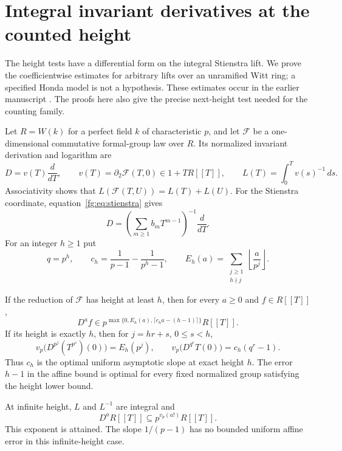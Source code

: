 \section{Integral invariant derivatives at the counted height}\label{fg:sec:derivatives}
The height tests have a differential form on the integral Stienstra
lift. We prove the coefficientwise estimates for arbitrary lifts over
an unramified Witt ring; a specified Honda model is not a hypothesis.
These estimates occur in the earlier manuscript
\citet[\S\S2--3]{fg-invariant-derivatives}. The proofs here also give the
precise next-height test needed for the counting family.

Let $R=W(k)$ for a perfect field $k$ of characteristic $p$, and let
$\mathcal F$ be a one-dimensional commutative formal-group law over $R$.
Its normalized invariant derivation and logarithm are
\[
 D=v(T)\frac d{dT},\qquad v(T)=\partial_2\mathcal F(T,0)\in1+TR[[T]],
 \qquad L(T)=\int_0^T v(s)^{-1}\,ds.
\]
Associativity shows that $L(\mathcal F(T,U))=L(T)+L(U)$.
For the Stienstra coordinate, equation~\eqref{fg:eq:stienstra} gives
\[
 D=\left(\sum_{m\ge1}b_mT^{m-1}\right)^{-1}\frac d{dT}.
\]
For an integer $h\ge1$ put
\[
 q=p^h,\qquad c_h=\frac1{p-1}-\frac1{p^h-1},\qquad
 E_h(a)=\sum_{\substack{j\ge1\\h\nmid j}}
                    \left\lfloor\frac a{p^j}\right\rfloor.
\]

\begin{theorem}\label{fg:thm:derivatives}
If the reduction of $\mathcal F$ has height at least $h$, then for every
$a\ge0$ and $f\in R[[T]]$,
\begin{equation}\label{fg:eq:derivative-bound}
 D^af\in
 p^{\max\{0,E_h(a),\lceil c_ha-(h-1)\rceil\}}R[[T]].
\end{equation}
If its height is exactly $h$, then for $j=hr+s$, $0\le s<h$,
\[
 v_p\bigl(D^{p^j}(T^{p^s})(0)\bigr)=E_h(p^j),\qquad
 v_p\bigl(D^{q^r}T(0)\bigr)=c_h(q^r-1).
\]
Thus $c_h$ is the optimal uniform asymptotic slope at exact height $h$.
The error $h-1$ in the affine bound is optimal for every fixed normalized
group satisfying the height lower bound.

At infinite height, $L$ and $L^{-1}$ are integral and
\[
 D^aR[[T]]\subseteq p^{v_p(a!)}R[[T]].
\]
This exponent is attained. The slope $1/(p-1)$ has no bounded uniform
affine error in this infinite-height case.
\end{theorem}

